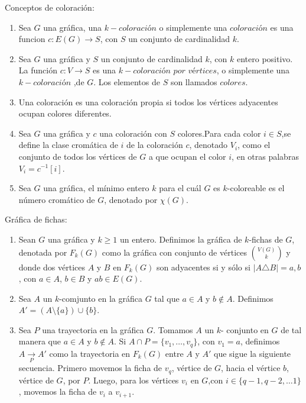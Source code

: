 \begin{definicion} Conceptos de coloraci\'on:
    \label{def:coloracion}
    \begin{enumerate}
        \item Sea $G$ una gr\'afica, una $k-\textit{coloraci\'on}$ o simplemente
        una $\textit{coloraci\'on}$ es una funcion $c: E(G)\rightarrow S$, con
        $S$ un conjunto de cardinalidad $k$.
        \item Sea $G$ una gr\'afica y $S$ un conjunto de cardinalidad $k$, con
        $k$ entero positivo. La funci\'on $c: V \rightarrow S$ es una
        $k-\textit{coloraci\'on por v\'ertices}$, o simplemente una
        $k-\textit{coloraci\'on}$ ,de $G$. Los elementos de $S$ son llamados
        $\textit{colores}$.
        \item Una coloraci\'on es una coloraci\'on propia si todos los
        v\'ertices adyacentes ocupan colores diferentes.
        \item Sea $G$ una gr\'afica y $c$ una coloraci\'on con $S$ colores.Para
        cada color $i \in S$,se define la clase crom\'atica de $i$ de la
        coloraci\'on $c$, denotado $V_i$, como el conjunto de todos los
        v\'ertices de $G$ a que ocupan el color $i$, en otras palabras $V_i =
        c^{-1}[i]$.
        \item  Sea $G$ una gr\'afica, el m\'inimo entero $k$ para el cu\'al $G$
        es $k$-coloreable es el n\'umero crom\'atico de $G$, denotado por
        $\chi(G)$.
    \end{enumerate}
\end{definicion}

\begin{definicion} Gr\'afica de fichas:
    \label{def:fichas}
    \begin{enumerate}
        \item Sean $G$ una gr\'afica y $k \geq 1$ un entero. Definimos la
        gr\'afica de $k$-fichas de $G$, denotada por $F_k(G)$ como la
        gr\'afica con conjunto de v\'ertices $\binom{V(G)}{k}$ y donde dos
        v\'ertices $A$ y $B$ en $F_k(G)$ son adyacentes si y s\'olo si $|A
        \triangle B| ={a,b}$, con $a \in A$, $b \in B$ y $ab \in E(G)$.
        \item Sea $A$ un $k$-comjunto en la gr\'afica $G$ tal que $a \in A$
        y $b\notin A$. Definimos $A'= (A \setminus \{a\}) \cup \{b\}$.
        \item Sea $P$ una trayectoria en la gr\'afica $G$. Tomamos $A$ un
        $k$- conjunto en $G$ de tal manera que $a\in A$ y $b \notin A$. Si
        $A\cap P =\{v_1, \dots, v_q\}$, con $v_1 = a$, definimos $A
        \xrightarrow[P]{} A'$ como la trayectoria en $F_k(G)$ entre $A$ y
        $A'$ que sigue la siguiente secuencia. Primero movemos la ficha de
        $v_q$, v\'ertice de $G$, hacia el v\'ertice $b$, v\'ertice de $G$,
        por $P$. Luego, para los v\'ertices $v_i$ en $G$,con $i \in \{q-1,
        q-2, \dots 1\}$, movemos la ficha de $v_i$ a $v_{i+1}$. 
    \end{enumerate}
\end{definicion}
